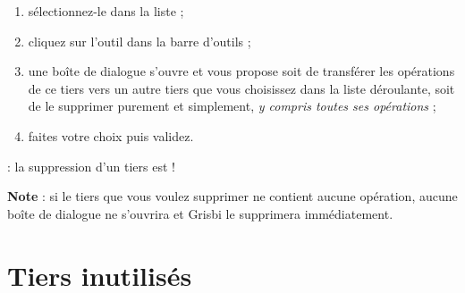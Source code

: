 \begin{enumerate}
	\ifIllustration
	\pichskip{7mm}
	\label{thirdparties-delete-img}
	\fi
	 \item sélectionnez-le dans la liste ;
	 \item cliquez sur l'outil  dans la barre d'outils ;
	 \item une  boîte de dialogue s'ouvre et vous propose soit de transférer les opérations de ce tiers vers un autre tiers que vous choisissez dans la liste déroulante, soit de le supprimer purement et simplement, \emph{y compris toutes ses opérations} ;
	 \item faites votre choix puis validez.
\end{enumerate}

\ifIllustration
\fi
 
 : la suppression d'un tiers est  !

\textbf{Note} : si le tiers que vous voulez supprimer ne contient aucune opération, aucune boîte de dialogue ne s'ouvrira et Grisbi le supprimera immédiatement.

\ifIllustration
\fi


\section{Tiers inutilisés\label{thirdparties-unused}}

